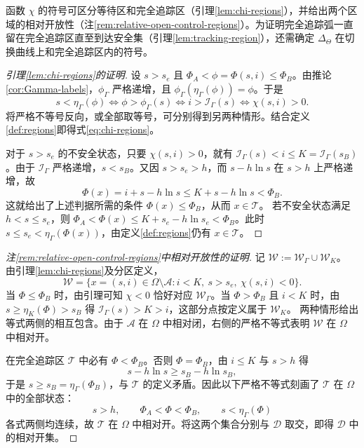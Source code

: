 \documentclass[lang=cn,a4paper,newtx]{elegantpaper}
\theoremstyle{plain}
\theoremstyle{definition}
\newcommand{\Acal}{\mathcal A}
\newcommand{\Dcal}{\mathcal D}
\begin{document}
函数 $\chi$ 的符号可区分等待区和完全追踪区（引理\ref{lem:chi-regions}），并给出两个区域的相对开放性（注\ref{rem:relative-open-control-regions}）。为证明完全追踪弧一直留在完全追踪区直至到达安全集（引理\ref{lem:tracking-region}），还需确定 $\Delta_\Theta$ 在切换曲线上和完全追踪区内的符号。

\begin{proof}[引理\ref{lem:chi-regions}的证明]
设 $s>s_e$ 且 $\Phi_A<\phi=\Phi(s,i)\le\Phi_B$。由推论\ref{cor:Gamma-labels}，$\phi_\Gamma$ 严格递增，且 $\phi_\Gamma(\eta_\Gamma(\phi))=\phi$。于是
\[
s<\eta_\Gamma(\phi)
\iff \phi>\phi_\Gamma(s)
\iff i>\mathcal I_\Gamma(s)
\iff \chi(s,i)>0.
\]
将严格不等号反向，或全部取等号，可分别得到另两种情形。结合定义\ref{def:regions}即得式\eqref{eq:chi-regions}。

对于 $s>s_e$ 的不安全状态，只要 $\chi(s,i)>0$，就有 $\mathcal I_\Gamma(s)<i\le K=\mathcal I_\Gamma(s_B)$。由于 $\mathcal I_\Gamma$ 严格递增，$s<s_B$。又因 $s>s_e>h$，而 $s-h\ln s$ 在 $s>h$ 上严格递增，故
\[
\Phi(x)=i+s-h\ln s\le K+s-h\ln s<\Phi_B.
\]
这就给出了上述判据所需的条件 $\Phi(x)\le\Phi_B$，从而 $x\in\mathcal T$。
若不安全状态满足 $h<s\le s_e$，则 $\Phi_A<\Phi(x)\le K+s_e-h\ln s_e<\Phi_B$。此时 $s\le s_e<\eta_\Gamma(\Phi(x))$，由定义\ref{def:regions}仍有 $x\in\mathcal T$。
\end{proof}

\begin{proof}[注\ref{rem:relative-open-control-regions}中相对开放性的证明]
记 $\mathcal W:=\mathcal W_\Gamma\cup\mathcal W_K$。
由引理\ref{lem:chi-regions}及分区定义，
\[
\mathcal W
=\{x=(s,i)\in\Omega\setminus\Acal:
  i<K,\ s>s_e,\ \chi(s,i)<0\}.
\]
当 $\Phi\le\Phi_B$ 时，由引理可知 $\chi<0$ 恰好对应 $\mathcal W_\Gamma$。当 $\Phi>\Phi_B$ 且 $i<K$ 时，由 $s\ge\eta_K(\Phi)>s_B$ 得 $\mathcal I_\Gamma(s)>K>i$，这部分点按定义属于 $\mathcal W_K$。
两种情形给出等式两侧的相互包含。由于 $\Acal$ 在 $\Omega$ 中相对闭，右侧的严格不等式表明 $\mathcal W$ 在 $\Omega$ 中相对开。

在完全追踪区 $\mathcal T$ 中必有 $\Phi<\Phi_B$。否则 $\Phi=\Phi_B$，由 $i\le K$ 与 $s>h$ 得
\[
s-h\ln s\ge s_B-h\ln s_B,
\]
于是 $s\ge s_B=\eta_\Gamma(\Phi_B)$，与 $\mathcal T$ 的定义矛盾。因此以下严格不等式刻画了 $\mathcal T$ 在 $\Omega$ 中的全部状态：
\[
s>h,\qquad \Phi_A<\Phi<\Phi_B,\qquad
s<\eta_\Gamma(\Phi)
\]
各式两侧均连续，故 $\mathcal T$ 在 $\Omega$ 中相对开。将这两个集合分别与 $\Dcal$ 取交，即得 $\Dcal$ 中的相对开集。
\end{proof}
\end{document}
